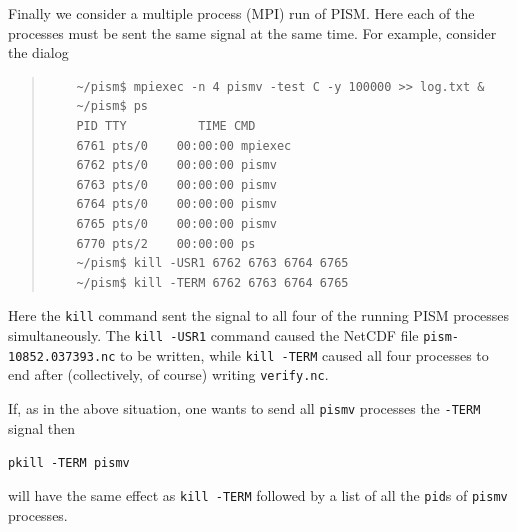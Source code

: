 \documentclass[11pt,final]{amsart}
\begin{document}
Finally we consider a multiple process (MPI) run of PISM.  Here each of the processes must be sent the same signal at the same time.  For example, consider the dialog
\begin{quote}
\begin{verbatim}
	~/pism$ mpiexec -n 4 pismv -test C -y 100000 >> log.txt &
	~/pism$ ps
	PID TTY          TIME CMD
	6761 pts/0    00:00:00 mpiexec
	6762 pts/0    00:00:00 pismv
	6763 pts/0    00:00:00 pismv
	6764 pts/0    00:00:00 pismv
	6765 pts/0    00:00:00 pismv
	6770 pts/2    00:00:00 ps
	~/pism$ kill -USR1 6762 6763 6764 6765
	~/pism$ kill -TERM 6762 6763 6764 6765
\end{verbatim}
\end{quote}
Here the \verb|kill| command sent the signal to all four of the running PISM processes simultaneously.  The \verb|kill -USR1| command caused the NetCDF file \verb|pism-10852.037393.nc| to be written, while \verb|kill -TERM| caused all four processes to end after (collectively, of course) writing \verb|verify.nc|.

If, as in the above situation, one wants to send all \verb|pismv| processes the \verb|-TERM| signal then 

  \verb|pkill -TERM pismv|

\noindent will have the same effect as \verb|kill -TERM| followed by a list of all the \verb|pid|s of \verb|pismv| processes.
\end{document}
